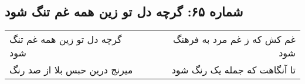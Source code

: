 \begin{center}
\section*{شماره ۶۵: گرچه دل تو زین همه غم تنگ شود}
\label{sec:065}
\begin{longtable}{l p{0.5cm} r}
گرچه دل تو زین همه غم تنگ شود
&&
غم کش که ز غم مرد به فرهنگ شود
\\
میرنج درین حبس بلا از صد رنگ
&&
تا آنگاهت که جمله یک رنگ شود
\\
\end{longtable}
\end{center}
